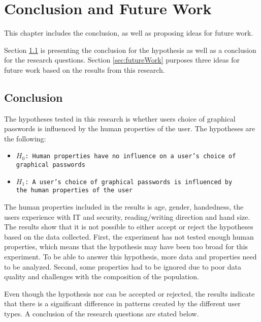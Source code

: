 \chapter{Conclusion and Future Work}\label{chap:conclusion}
  
  This chapter includes the conclusion, as well as proposing ideas for future work. 

  Section \ref{sec:conclusion} is presenting the conclusion for the hypothesis as well as a conclusion for the research questions. Section \ref{sec:futureWork} purposes three ideas for future work based on the results from this research. 

  \clearpage
  \section{Conclusion}\label{sec:conclusion}
    
    The hypotheses tested in this research is whether users choice of graphical passwords is influenced by the human properties of the user. The hypotheses are the following:

    {\renewcommand\labelitemi{}
          \begin{itemize}
            \item \texttt{$H_{0}$: Human properties have no influence on a user's choice of \\graphical passwords}
            \item \texttt{$H_{1}$: A user's choice of graphical passwords is influenced by \\the human properties of the user}
          \end{itemize}
        }

    The human properties included in the results is age, gender, handedness, the users experience with IT and security, reading/writing direction and hand size. The results show that it is not possible to either accept or reject the hypotheses based on the data collected. 
    First, the experiment has not tested enough human properties, which means that the hypothesis may have been too broad for this experiment. To be able to answer this hypothesis, more data and properties need to be analyzed. Second, some properties had to be ignored due to poor data quality and challenges with the composition of the population.

    Even though the hypothesis nor can be accepted or rejected, the results indicate that there is a significant difference in patterns created by the different user types. A conclusion of the research questions are stated below. 


